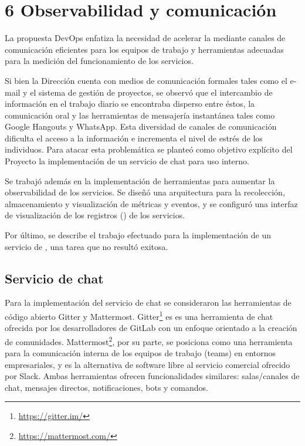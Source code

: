 \chapter{6 Observabilidad y comunicación}

La propuesta DevOps enfatiza la necesidad de acelerar la
 mediante canales de comunicación eficientes
para los equipos de trabajo y herramientas adecuadas para la medición
del funcionamiento de los servicios.

Si bien la Dirección cuenta con medios de comunicación formales tales
como el e-mail y el sistema de gestión de proyectos, se observó que el
intercambio de información en el trabajo diario se encontraba disperso
entre éstos, la comunicación oral y las herramientas de mensajería
instantánea tales como Google Hangouts y WhatsApp. Esta diversidad de
canales de comunicación dificulta el acceso a la información e
incrementa el nivel de estrés de los individuos. Para atacar esta
problemática se planteó como objetivo explícito del Proyecto la
implementación de un servicio de chat para uso interno.

Se trabajó además en la implementación de herramientas para aumentar
la observabilidad de los servicios. Se diseñó una arquitectura para la
recolección, almacenamiento y visualización de métricas y eventos, y
se configuró una interfaz de visualización de los registros
() de los servicios.

Por último, se describe el trabajo efectuado para la implementación de
un servicio de , una tarea que no
resultó exitosa.

\section{Servicio de chat}

Para la implementación del servicio de chat se consideraron las
herramientas de código abierto Gitter y Mattermost. Gitter\footnote{
  \href{https://gitter.im/}{https://gitter.im/}} es es una herramienta
de chat ofrecida por los desarrolladores de GitLab con un enfoque
orientado a la creación de comunidades. Mattermost\footnote{
  \href{https://mattermost.com/}{https://mattermost.com/} }, por su
parte, se posiciona como una herramienta para la comunicación interna
de los equipos de trabajo (teams) en entornos empresariales, y es la
alternativa de software libre al servicio comercial ofrecido por
Slack. Ambas herramientas ofrecen funcionalidades similares:
salas/canales de chat, mensajes directos, notificaciones, bots y
comandos.


